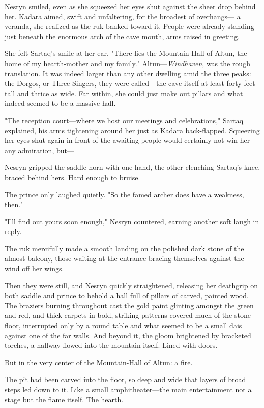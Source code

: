 Nesryn smiled, even as she squeezed her eyes shut against the sheer drop behind her. Kadara aimed, swift and unfaltering, for the broadest of overhangs--- a veranda, she realized as the ruk banked toward it. People were already standing just beneath the enormous arch of the cave mouth, arms raised in greeting.

She felt Sartaq's smile at her ear. "There lies the Mountain-Hall of Altun, the home of my hearth-mother and my family." Altun---\emph{Windhaven}, was the rough translation. It was indeed larger than any other dwelling amid the three peaks: the Dorgos, or Three Singers, they were called---the cave itself at least forty feet tall and thrice as wide. Far within, she could just make out pillars and what indeed seemed to be a massive hall.

"The reception court---where we host our meetings and celebrations," Sartaq explained, his arms tightening around her just as Kadara back-flapped. Squeezing her eyes shut again in front of the awaiting people would certainly not win her any admiration, but---

Nesryn gripped the saddle horn with one hand, the other clenching Sartaq's knee, braced behind hers. Hard enough to bruise.

The prince only laughed quietly. "So the famed archer does have a weakness, then."

"I'll find out yours soon enough," Nesryn countered, earning another soft laugh in reply.

The ruk mercifully made a smooth landing on the polished dark stone of the almost-balcony, those waiting at the entrance bracing themselves against the wind off her wings.

Then they were still, and Nesryn quickly straightened, releasing her deathgrip on both saddle and prince to behold a hall full of pillars of carved, painted wood. The braziers burning throughout cast the gold paint glinting amongst the green and red, and thick carpets in bold, striking patterns covered much of the stone floor, interrupted only by a round table and what seemed to be a small dais against one of the far walls. And beyond it, the gloom brightened by bracketed torches, a hallway flowed into the mountain itself. Lined with doors.

But in the very center of the Mountain-Hall of Altun: a fire.

The pit had been carved into the floor, so deep and wide that layers of broad steps led down to it. Like a small amphitheater---the main entertainment not a stage but the flame itself. The hearth.

